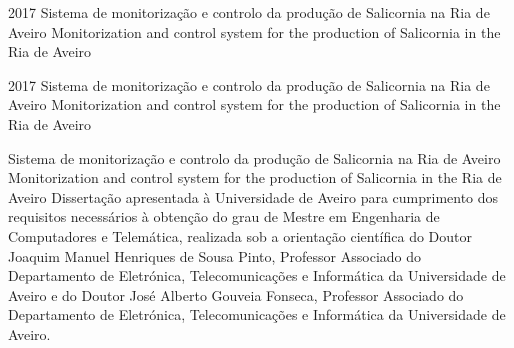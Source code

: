 \documentclass[11pt,twoside,a4paper]{report}
\def\ThesisYear{2017}
\newcommand{\namethesispt}{Sistema de monitorização e controlo da produção de Salicornia na Ria de Aveiro}
\newcommand{\namethesisen}{Monitorization and control system for the production of Salicornia in the Ria de Aveiro}
\begin{document}
%
%

\TitlePage
         {\ThesisYear}
        {\namethesispt
        \newline \newline
       	\namethesisen
    	}
\EndTitlePage
\titlepage\ \endtitlepage %

\TitlePage
  \HEADER{\BAR\FIG{\begin{minipage}{50mm} %
          \end{minipage}}}
         {\ThesisYear}
{\namethesispt
\newline \newline
\namethesisen}
\EndTitlePage
\titlepage\ \endtitlepage %


%
%

\TitlePage
  \HEADERSEM{}{\ThesisYear}
  {\namethesispt
  	\newline \newline
  	\namethesisen
  }
  \vspace*{15mm}
  \TEXT{}
       {Dissertação apresentada à Universidade de Aveiro para cumprimento dos requisitos necessários à obtenção do grau de Mestre em Engenharia de Computadores e Telemática, realizada sob a orientação científica do Doutor Joaquim Manuel Henriques de Sousa Pinto, Professor Associado do Departamento de Eletrónica, Telecomunicações e Informática da Universidade de Aveiro e do Doutor José Alberto Gouveia Fonseca, Professor Associado do Departamento de Eletrónica, Telecomunicações e Informática da Universidade de Aveiro. }
\EndTitlePage
\titlepage\ \endtitlepage %
\end{document}
